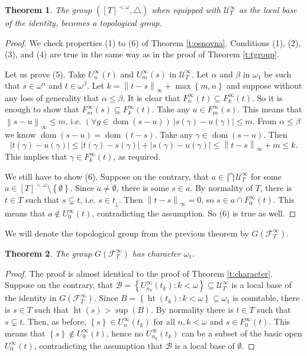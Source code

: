 \documentclass{amsart}
\theoremstyle{plain}
\newtheorem{theorem}{Theorem}[section]
\theoremstyle{definition}
\numberwithin{equation}{section}
\renewcommand{\a}{\alpha}
\renewcommand{\b}{\beta}
\newcommand{\g}{\gamma}
\renewcommand{\o}{\omega}
\newcommand{\ps}{\emptyset}
\newcommand{\sst}{\subseteq}
\newcommand{\cu}{\mathcal U}
\newcommand{\ft}{\mathcal F^{\infty}_T}
\newcommand{\set}[1]{\left\{#1\right\}}
\newcommand{\abs}[1]{\left\vert#1\right\vert}
\newcommand{\norm}[1]{\left\lVert#1\right\rVert_{\infty}}
\newcommand{\dom}{\operatorname{dom}}
\newcommand{\h}{\operatorname{ht}}
\begin{document}
\begin{theorem}\label{t:treealt-group}
	The group $([T]^{<\o},\triangle)$ when equipped with $\cu^{\infty}_T$ as the local base of the identity, becomes a topological group.
\end{theorem}
\begin{proof}
	We check properties (1) to (6) of Theorem \ref{t:osnovna}.
	Conditions (1), (2), (3), and (4) are true in the same way as in the proof of Theorem \ref{t:tgroup}.
	
	Let us prove (5).
	Take $U^{\infty}_n(t)$ and $U^{\infty}_m(s)$ in $\cu^{\infty}_T$.
	Let $\a$ and $\b$ in $\o_1$ be such that $s\in \o^{\a}$ and $t\in \o^{\b}$.
	Let $k=\norm{t-s}+\max\set{m,n}$ and suppose without any loss of generality that $\a\le\b$.
	It is clear that $F^{\infty}_n(t)\sst F^{\infty}_k(t)$.
	So it is enough to show that $F^{\infty}_m(s)\sst F^{\infty}_k(t)$.
	Take any $u\in F^{\infty}_m(s)$.
	This means that $\norm{s-u}\le m$, i.e. $(\forall g\in\dom(s-u))\ \abs{s(\g)-u(\g)}\le m$.
	From $\a\le\b$ we know $\dom(s-u)=\dom(t-s)$.
	Take any $\g\in \dom(s-u)$.
	Then $$\abs{t(\g)-u(\g)}\le \abs{t(\g)-s(\g)}+\abs{s(\g)-u(\g)}\le \norm{t-s}+m\le k.$$
	This implies that $\g\in F^{\infty}_k(t)$, as required.
	
	We still have to show (6).
	Suppose on the contrary, that $a\in\bigcap\cu^{\infty}_T$ for some $a\in [T]^{<\o}\setminus\set{\ps}$.
	Since $a\neq\ps$, there is some $s\in a$. 
	By normality of $T$, there is $t\in T$ such that $s\subsetneq t$, i.e. $s\in t_{\downarrow}$.
	Then $\norm{t-s}=0$, so $s\in a\cap F^{\infty}_0(t)$.
	This means that $a\notin U^{\infty}_0(t)$, contradicting the assumption.
	So (6) is true as well.
\end{proof}

We will denote the topological group from the previous theorem by $G(\ft)$.

\begin{theorem}
	The group $G(\ft)$ has character $\o_1$.
\end{theorem}
\begin{proof}
	The proof is almost identical to the proof of Theorem \ref{t:character}.
	Suppose on the contrary, that $\mathcal B=\set{U^{\infty}_{n_k}(t_k):k<\o}\sst \cu^{\infty}_T$ is a local base of the identity in $G(\ft)$.
	Since $B=\set{\h(t_k):k<\o}\sst\o_1$ is countable, there is $s\in T$ such that $\h(s)>\sup(B)$.
	By normality there is $t\in T$ such that $s\subsetneq t$.
	Then, as before, $\set{s}\in U^{\infty}_n(t_k)$ for all $n,k<\o$ and $s\in F^{\infty}_0(t)$.
	This means that $\set{s}\notin U^{\infty}_0(t)$, hence no $U^{\infty}_{n_k}(t_k)$ can be a subset of the basic open $U^{\infty}_0(t)$, contradicting the assumption that $\mathcal B$ is a local base of $\ps$.
\end{proof}
\end{document}

